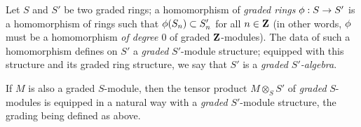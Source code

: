 \begin{env}[2.1.2]
Let $S$ and $S'$ be two graded rings;
a homomorphism of \emph{graded rings $\vphi:S\to S'$} is a homomorphism of rings such that $\phi(S_n)\subset S_n'$ for all $n\in\mathbf{Z}$ (in other words, $\phi$ must be a homomorphism \emph{of degree $0$} of graded $\mathbf{Z}$-modules).
The data of such a homomorphism defines on $S'$ a \emph{graded} $S'$-module structure;
equipped with this structure and its graded ring structure, we say that $S'$ is a \emph{graded $S'$-algebra}.

If $M$ is also a graded $S$-module, then the tensor product $M\otimes_S S'$ of \emph{graded} $S$-modules is equipped in a natural way with a \emph{graded} $S'$-module structure, the grading being defined as above.
\end{env}



